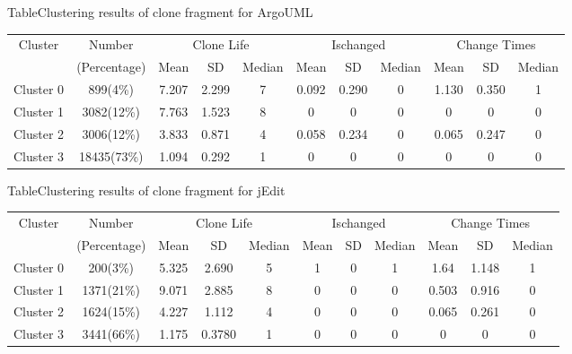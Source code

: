 \begin{table}[htbp]
{Table$\!$}{Clustering results of clone fragment for ArgoUML}
\vspace{0.5em}
\centering
\footnotesize
\begin{tabular}{ccccccccccc}
\toprule[1.5pt]
\multirow{2}{*}{Cluster}&{Number}&\multicolumn{3}{c}{Clone Life}&\multicolumn{3}{c}{Ischanged}&\multicolumn{3}{c}{Change Times} \\
\cline{3-11}
&(Percentage)&{Mean}&SD &{Median}&{Mean}&SD &{Median}&{Mean}&SD &{Median}\\
\midrule[1pt]
Cluster 0&899(4\%)&7.207&2.299&7&0.092&0.290&0&1.130&0.350&1\\ 
Cluster 1&3082(12\%)&7.763&1.523&8&0&0&0	&0&0&0\\ 
Cluster 2&3006(12\%)&3.833&0.871&4&0.058&0.234&0	&0.065&0.247&0\\ 
Cluster 3&18435(73\%)&1.094&0.292&1	&0	&0	&0	&0	&0	&0\\ 
\bottomrule[1.5pt]
\end{tabular}
\end{table}

\begin{table}[htbp]
{Table$\!$}{Clustering results of clone fragment for jEdit}
\vspace{0.5em}
\centering
\footnotesize
\begin{tabular}{ccccccccccc}
\toprule[1.5pt]
\multirow{2}{*}{Cluster}&{Number}&\multicolumn{3}{c}{Clone Life}&\multicolumn{3}{c}{Ischanged}&\multicolumn{3}{c}{Change Times} \\
\cline{3-11}
&(Percentage)&{Mean}&SD &{Median}&{Mean}&SD&{Median}&{Mean}&SD &{Median}\\
\midrule[1pt]
Cluster 0&200(3\%)&5.325&2.690&5&1	&0	&1	&1.64	&1.148&1\\ 
Cluster 1&1371(21\%)	&9.071&2.885&8	&0	&0	&0	&0.503&0.916&0\\ 
Cluster 2&	1624(15\%)	&4.227&1.112&4	&0	&0	&0	&0.065&0.261&0\\ 
Cluster 3&	3441(66\%)	&1.175	&0.3780&1	&0	&0	&0	&0	&0	&0\\ 
\bottomrule[1.5pt]
\end{tabular}
\end{table}

